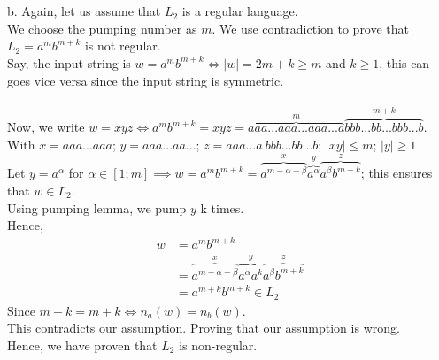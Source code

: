 \documentclass{report}
\begin{document}
{\\~\\
b. Again, let us assume that $L_2$ is a regular language.\\
We choose the pumping number as $m$. We use contradiction to prove that $L_2 = a^mb^{m+k}$ is not regular.\\
Say, the input string is $w = a^mb^{m+k} \Leftrightarrow |w| = 2m+k \geq m$ and $k \geq 1$, this can goes vice versa since the input string is symmetric.\\~\\
Now, we write $w = xyz \Leftrightarrow a^mb^{m+k} = xyz = \overbrace{aaa...aaa...aaa...a}^{m}\overbrace{bbb...bb...bbb...b}^{m+k}$.\\
With $x = aaa...aaa$; $y = aaa...aa...$; $z = aaa...a~bbb...bb...b$; $|xy| \leq m$; $|y| \geq 1$\\
Let $y = a^\alpha$ for $\alpha \in [1; m] \implies w = a^mb^{m+k} = \overbrace{a^{m-\alpha-\beta}}^{x} \overbrace{a^{\alpha}}^{y} \overbrace{a^{\beta}b^{m+k}}^{z}$; this ensures that $w \in L_2$.\\
Using pumping lemma, we pump $y$ k times. \\
Hence,
\begin{equation*}
    \begin{aligned}
        w &= a^mb^{m+k} \\
          &= \overbrace{a^{m-\alpha-\beta}}^{x} \overbrace{a^{\alpha} a^{k}}^{y} \overbrace{a^{\beta}b^{m+k}}^{z}\\
          &= a^{m + k}b^{m+k} \in L_2
    \end{aligned}
\end{equation*}
\noindent Since $m + k = m + k \Leftrightarrow n_a(w) = n_b(w)$.\\
This contradicts our assumption. Proving that our assumption is wrong.\\
Hence, we have proven that $L_2$ is non-regular.
}

\pagebreak

\end{document}
